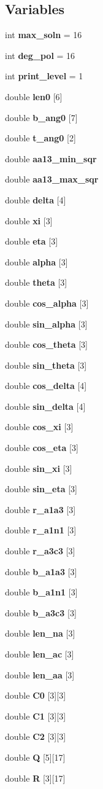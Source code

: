 \subsection*{Variables}
\begin{CompactItemize}
\item 
int {\bf max\_\-soln} = 16
\item 
int {\bf deg\_\-pol} = 16
\item 
int {\bf print\_\-level} = 1
\item 
double {\bf len0} [6]
\item 
double {\bf b\_\-ang0} [7]
\item 
double {\bf t\_\-ang0} [2]
\item 
double {\bf aa13\_\-min\_\-sqr}
\item 
double {\bf aa13\_\-max\_\-sqr}
\item 
double {\bf delta} [4]
\item 
double {\bf xi} [3]
\item 
double {\bf eta} [3]
\item 
double {\bf alpha} [3]
\item 
double {\bf theta} [3]
\item 
double {\bf cos\_\-alpha} [3]
\item 
double {\bf sin\_\-alpha} [3]
\item 
double {\bf cos\_\-theta} [3]
\item 
double {\bf sin\_\-theta} [3]
\item 
double {\bf cos\_\-delta} [4]
\item 
double {\bf sin\_\-delta} [4]
\item 
double {\bf cos\_\-xi} [3]
\item 
double {\bf cos\_\-eta} [3]
\item 
double {\bf sin\_\-xi} [3]
\item 
double {\bf sin\_\-eta} [3]
\item 
double {\bf r\_\-a1a3} [3]
\item 
double {\bf r\_\-a1n1} [3]
\item 
double {\bf r\_\-a3c3} [3]
\item 
double {\bf b\_\-a1a3} [3]
\item 
double {\bf b\_\-a1n1} [3]
\item 
double {\bf b\_\-a3c3} [3]
\item 
double {\bf len\_\-na} [3]
\item 
double {\bf len\_\-ac} [3]
\item 
double {\bf len\_\-aa} [3]
\item 
double {\bf C0} [3][3]
\item 
double {\bf C1} [3][3]
\item 
double {\bf C2} [3][3]
\item 
double {\bf Q} [5][17]
\item 
double {\bf R} [3][17]
\end{CompactItemize}


